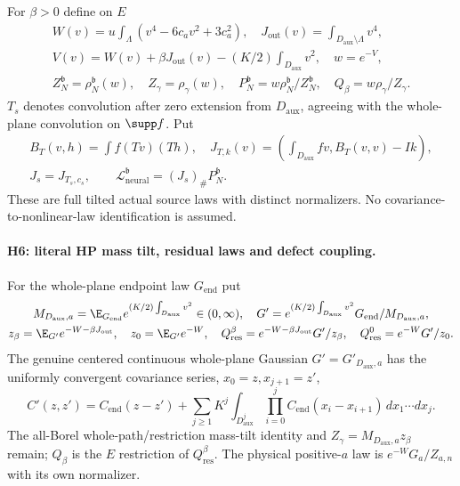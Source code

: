 For $\beta>0$ define on $E$
\begin{gather*}
 W(v)=u\int_\Lambda(v^4-6c_av^2+3c_a^2),\quad
 J_{\mathrm{out}}(v)=\int_{D_{\mathrm{aux}}\setminus\Lambda}v^4,\\
 V(v)=W(v)+\beta J_{\mathrm{out}}(v)-(K/2)\int_{D_{\mathrm{aux}}}v^2,\quad w=e^{-V},\\
 Z_N^{\mathfrak b}=\rho_N^{\mathfrak b}(w),\quad Z_\gamma=\rho_\gamma(w),\quad
 P_N^{\mathfrak b}=w\rho_N^{\mathfrak b}/Z_N^{\mathfrak b},\quad
 Q_\beta=w\rho_\gamma/Z_\gamma.
\end{gather*}
$T_s$ denotes convolution after zero extension from $D_{\mathrm{aux}}$,
agreeing with the whole-plane convolution on $\supp f$. Put
\begin{gather*}
 B_T(v,h)=\int f(Tv)(Th),\quad
 J_{T,k}(v)=(\int_{D_{\mathrm{aux}}}fv,B_T(v,v)-Ik),\\
 J_s=J_{T_s,c_s},\qquad
 \mathcal L_{\mathrm{neural}}^{\mathfrak b}=(J_s)_\#P_N^{\mathfrak b}.
\end{gather*}
These are full tilted actual source laws with distinct normalizers.
No covariance-to-nonlinear-law identification is assumed.

\paragraph{H6: literal HP mass tilt, residual laws and defect coupling.}
For the whole-plane endpoint law $G_{\mathrm{end}}$ put
\begin{gather*}
 M_{D_{\mathrm{aux}},a}=\E_{G_{\mathrm{end}}}
       e^{(K/2)\int_{D_{\mathrm{aux}}}v^2}\in(0,\infty),\quad
 G'=e^{(K/2)\int_{D_{\mathrm{aux}}}v^2}G_{\mathrm{end}}/M_{D_{\mathrm{aux}},a},\\
 z_\beta=\E_{G'}e^{-W-\beta J_{\mathrm{out}}},\quad z_0=\E_{G'}e^{-W},\quad
 Q_{\mathrm{res}}^\beta=e^{-W-\beta J_{\mathrm{out}}}G'/z_\beta,\quad
 Q_{\mathrm{res}}^0=e^{-W}G'/z_0.
\end{gather*}
The genuine centered continuous whole-plane Gaussian $G'=G'_{D_{\mathrm{aux}},a}$
has the uniformly convergent covariance series, $x_0=z,x_{j+1}=z'$,
\[
 C'(z,z')=C_{\mathrm{end}}(z-z')+
 \sum_{j\ge1}K^j\int_{D_{\mathrm{aux}}^j}
          \prod_{i=0}^j C_{\mathrm{end}}(x_i-x_{i+1})\,dx_1\cdots dx_j.
\]
The all-Borel whole-path/restriction mass-tilt identity and
$Z_\gamma=M_{D_{\mathrm{aux}},a}z_\beta$ remain; $Q_\beta$ is the
$E$ restriction of $Q_{\mathrm{res}}^\beta$. The physical positive-$a$
law is $e^{-W}G_a/Z_{a,n}$ with its own normalizer.

